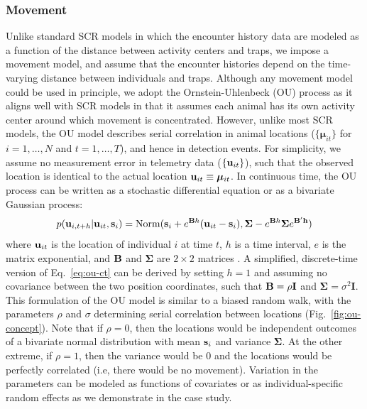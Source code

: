 \documentclass[12pt]{article}
\newcommand{\bsi}{{\bf s}_i}
\newcommand{\bu}{{\bf u}}
\newcommand{\buit}{{\bf u}_{it}}
\begin{document}
\subsubsection{Movement}

Unlike standard SCR models in which the encounter history data are
modeled as a function of the distance between activity centers and
traps, we impose a movement model, and assume that the encounter
histories depend on the time-varying distance between individuals and
traps. Although any movement model could be used in principle, we
adopt the Ornstein-Uhlenbeck (OU) process as it aligns well with SCR
models in that it assumes each animal has its own activity center
around which movement is concentrated. However, unlike most SCR
models, the OU model describes serial correlation in animal locations
($\{{\bm \mu}_{it}\}$ for $i=1,\dots,N$ and $t=1,\dots,T$), and hence in
detection events. For simplicity, we assume no measurement error in
telemetry data ($\{\buit\}$), such that the observed 
location is identical to the actual location $\buit \equiv {\bm
  \mu}_{it}$. In continuous time, the OU process can be written as
a stochastic differential equation or as a bivariate Gaussian process:
\begin{equation}
  p(\bu_{i,t+h}|\buit,\bsi) = \mathrm{Norm}(\bsi + e^{{\bf B}h}(\buit-\bsi), \bm{\Sigma} - e^{{\bf B} h} {\bm \Sigma} e^{\bf{B}' h})
  \label{eq:ou-ct}
\end{equation}
where $\buit$ is the location of individual $i$ at time $t$, $h$ is
a time interval, $e$ is the matrix exponential, and $\bf B$ and $\bm
\Sigma$ are $2\times 2$ matrices 
\citep{dunn_gipson:1977,blackwell:1997,blackwell_etal:2016}.
A simplified, discrete-time version of Eq.~\ref{eq:ou-ct} can be
derived by setting $h=1$ and assuming no covariance between the two
position coordinates, such that ${\bf B} = \rho \mathbf{I}$ and
${\bm \Sigma} = \sigma^2\mathbf{I}$. 
This formulation of the OU model is similar to a biased random walk, 
with the parameters $\rho$ and $\sigma$ determining serial
correlation between locations (Fig.~\ref{fig:ou-concept}). Note that
if $\rho=0$, then the locations would be independent outcomes of
a bivariate normal distribution with mean $\bsi$ and variance $\bm
\Sigma$. At the other extreme, if $\rho=1$, then the variance would
be 0 and the locations would be perfectly correlated (i.e, there would
be no movement). Variation in the parameters can be modeled as functions of 
covariates or as individual-specific random effects as we demonstrate
in the case study.
\end{document}
